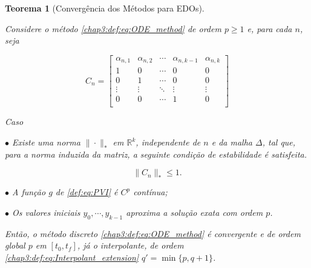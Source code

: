 \documentclass{beamer}
\newcommand{\R}{\mathbb{R}}
\theoremstyle{plain}
\newtheorem{teo}{Teorema}
\theoremstyle{definition}
\begin{document}
\begin{frame}%
    \scriptsize
    \begin{teo}[Convergência dos Métodos para EDOs]
        \label{chap3:teo:continuous_ODE}

        Considere o método \eqref{chap3:def:eq:ODE_method} de ordem $p \geq 1$ e, para cada $n$, seja

        \[
            C_n = 
            \begin{bmatrix}
                \alpha_{n, 1} & \alpha_{n, 2} & \cdots  & \alpha_{n, k - 1} & \alpha_{n, k} \\
                1 & 0 & \cdots & 0 & 0 \\
                0 & 1 & \cdots & 0 & 0 \\
                \vdots & \vdots & \ddots & \vdots & \vdots \\
                0 & 0 & \cdots & 1 & 0 \\
            \end{bmatrix}
        \]

        Caso 

        \phantom{aa} $\bullet$ Existe uma norma $\| \cdot \|_* $ em $\R^k$, independente de $n$ e da malha $\Delta$, tal que, para a norma induzida da matriz, a seguinte condição de estabilidade é satisfeita.

        \begin{equation}
            \| C_n \|_* \leq 1.
            \label{chap3:teo:ODE_methods_convergence:eq:stability_condition}
        \end{equation}

        \phantom{aa} $\bullet$ A função $g$ de \eqref{def:eq:PVI} é $C^p$ contínua;

        \phantom{aa} $\bullet$ Os valores iniciais $y_0, \cdots, y_{k-1}$ aproxima a solução exata com ordem $p$.

        Então, o método discreto \eqref{chap3:def:eq:ODE_method} é convergente e de ordem global $p$ em $[t_0, t_f]$, já o interpolante, de ordem \eqref{chap3:def:eq:Interpolant_extension} $q' = \min\{p, q+1\}$.
    \end{teo}


\end{frame}


\end{document}
